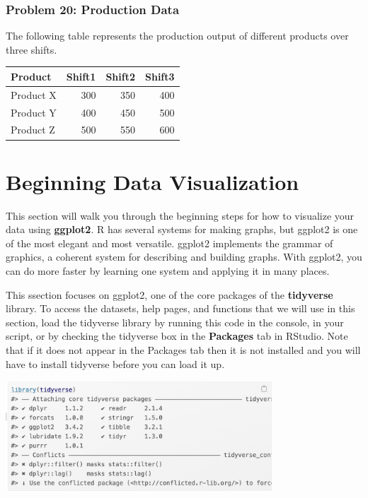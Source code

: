 \documentclass[
  letterpaper,
  DIV=11,
  numbers=noendperiod]{scrreprt}
\begin{document}
\subsection*{Problem 20: Production
Data}\label{problem-20-production-data}

The following table represents the production output of different
products over three shifts.

\begin{table}
\centering
\begin{tabular}{l|r|r|r}
\hline
Product & Shift1 & Shift2 & Shift3\\
\hline
Product X & 300 & 350 & 400\\
\hline
Product Y & 400 & 450 & 500\\
\hline
Product Z & 500 & 550 & 600\\
\hline
\end{tabular}
\end{table}


\chapter*{Beginning Data
Visualization}\label{beginning-data-visualization}


This section will walk you through the beginning steps for how to
visualize your data using \textbf{ggplot2}. R has several systems for
making graphs, but ggplot2 is one of the most elegant and most
versatile. ggplot2 implements the grammar of graphics, a coherent system
for describing and building graphs. With ggplot2, you can do more faster
by learning one system and applying it in many places.

This ssection focuses on ggplot2, one of the core packages of the
\textbf{tidyverse} library. To access the datasets, help pages, and
functions that we will use in this section, load the tidyverse library
by running this code in the console, in your script, or by checking the
tidyverse box in the \textbf{Packages} tab in RStudio. Note that if it
does not appear in the Packages tab then it is not installed and you
will have to install tidyverse before you can load it up.

\includegraphics[width=0.75\textwidth,height=\textheight]{./images/Daily-2-Pic-1.jpg}
\end{document}

